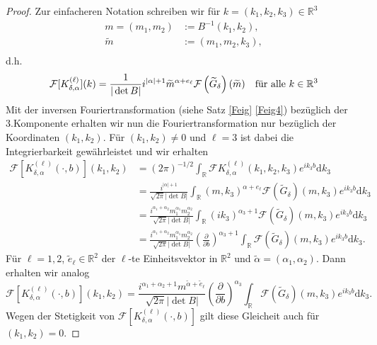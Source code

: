 \documentclass[12pt,a4paper]{scrartcl}
\newcommand{\dd}{\mathrm{d}}
\numberwithin{equation}{section}
\newcommand{\R}{\mathbb{R}} %
\newcommand{\F}{\mathcal{F}} %
\newcommand{\fa}{\text{\quad für alle }}
\begin{document}
\begin{proof}
Zur einfacheren Notation schreiben wir für $k=(k_1,k_2,k_3)\in \R^3$ 
\begin{align*}
m=(m_1,m_2)&:=B^{-1}(k_1,k_2), \\
\widetilde m &:= (m_1,m_2,k_3),\\
\end{align*}
d.h.
\[
\F [K_{\delta,\alpha}^{(\ell)}](k)=\frac{1}{|\det B|} i^{|\alpha|+1} \widetilde m^{\alpha + e_\ell} \F \left(\widetilde{G}_\delta\right)(\widetilde m) \fa k\in \R^3
\] 
Mit der inversen Fouriertransformation (siehe Satz \ref{Feig} \ref{Feig4}) bezüglich der 3.Komponente erhalten wir nun die Fouriertransformation nur bezüglich der Koordinaten $(k_1,k_2)$. Für $(k_1,k_2) \neq 0$ und $\ell =3$ ist dabei die Integrierbarkeit gewährleistet und wir erhalten
\begin{align*}
\F [K_{\delta,\alpha}^{(\ell)}(\cdot,b)](k_1,k_2) 
& =(2\pi)^{-1/2} \int_\R \F K_{\delta,\alpha}^{(\ell)}(k_1,k_2,k_3) e^{i k_3 b} \dd k_3 \\
&= \frac{i^{|\alpha|+1}}{\sqrt{2 \pi}|\det B|} \int_\R  (m,k_3)^{\alpha + e_\ell} \F \left(\widetilde{G}_\delta\right)(m,k_3) e^{i k_3 b} \dd k_3\\
&= \frac{i^{\alpha_1 + \alpha_2} m_1^{\alpha_1} m_2^{\alpha_2}}{\sqrt{2 \pi}|\det B|} \int_\R  (i k_3)^{\alpha_3+1} \F \left(\widetilde{G}_\delta\right)(m,k_3) e^{i k_3 b} \dd k_3 \\
&= \frac{i^{\alpha_1 + \alpha_2} m_1^{\alpha_1} m_2^{\alpha_2}}{\sqrt{2 \pi}|\det B|} \left(\frac{\partial}{\partial b}\right)^{\alpha_3 + 1}\int_\R  \F \left(\widetilde{G}_\delta\right)(m,k_3) e^{i k_3 b} \dd k_3 . 
\end{align*}
Für $\ell=1,2$, $\tilde e_\ell \in \R^2$ der $\ell$-te Einheitsvektor in $\R^2$ und $\tilde \alpha= (\alpha_1,\alpha_2)$. Dann erhalten wir analog
\[
\F [K_{\delta,\alpha}^{(\ell)}(\cdot,b)](k_1,k_2) = \frac{i^{\alpha_1+\alpha_2+1} m^{\tilde \alpha+ \tilde e_\ell}}{\sqrt{2 \pi}|\det B|} \left(\frac{\partial}{\partial b}\right)^{\alpha_3}\int_\R  \F \left(\widetilde{G}_\delta\right)(m,k_3) e^{i k_3 b} \dd k_3.
\]
Wegen der Stetigkeit von $\F [K_{\delta,\alpha}^{(\ell)}(\cdot,b)]$ gilt diese Gleicheit auch für $(k_1,k_2)=0$.




\end{proof}
\end{document}
